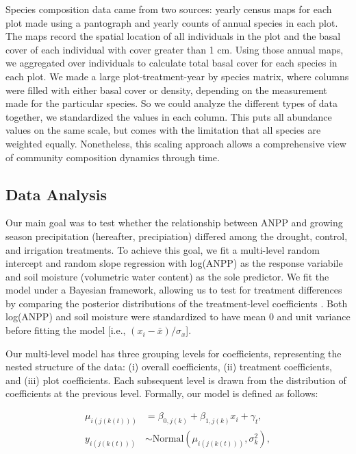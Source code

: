 \documentclass[fleqn,10pt,lineno]{wlpeerj} %
\begin{document}
Species composition data came from two sources: yearly census maps for
each plot made using a pantograph \citep{Hill1920} and yearly counts of
annual species in each plot. The maps record the spatial location of all
individuals in the plot and the basal cover of each individual with
cover greater than 1 cm. Using those annual maps, we aggregated over
individuals to calculate total basal cover for each species in each
plot. We made a large plot-treatment-year by species matrix, where
columns were filled with either basal cover or density, depending on the
measurement made for the particular species. So we could analyze the
different types of data together, we standardized the values in each
column. This puts all abundance values on the same scale, but comes with
the limitation that all species are weighted equally. Nonetheless, this
scaling approach allows a comprehensive view of community composition
dynamics through time.

\subsection{Data Analysis}\label{data-analysis}

Our main goal was to test whether the relationship between ANPP and
growing season precipitation (hereafter, precipiation) differed among
the drought, control, and irrigation treatments. To achieve this goal,
we fit a multi-level random intercept and random slope regression with
log(ANPP) as the response variabile and soil moisture (volumetric water
content) as the sole predictor. We fit the model under a Bayesian
framework, allowing us to test for treatment differences by comparing
the posterior distributions of the treatment-level coefficients
\citep[e.g.,][]{Tredennick2013}. Both log(ANPP) and soil moisture were
standardized to have mean 0 and unit variance before fitting the model
{[}i.e., \((x_i - \bar{x})/\sigma_x\){]}.

Our multi-level model has three grouping levels for coefficients,
representing the nested structure of the data: (i) overall coefficients,
(ii) treatment coefficients, and (iii) plot coefficients. Each
subsequent level is drawn from the distribution of coefficients at the
previous level. Formally, our model is defined as follows:

\vspace{-2em}

\begin{align}
\mu_{i(j(k(t)))} &= \beta_{0,j(k)} + \beta_{1,j(k)}x_i + \gamma_t, \\
y_{i(j(k(t)))} &\sim \text{Normal} \left(\mu_{i(j(k(t)))}, \sigma^2_{k} \right),
\end{align}
\end{document}
